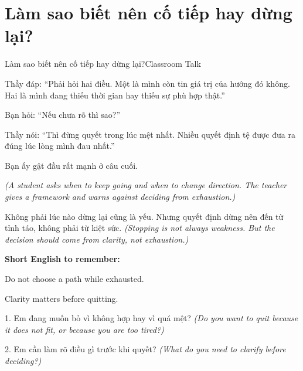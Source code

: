 \section{Làm sao biết nên cố tiếp hay dừng lại?}
\begin{truyen}{Làm sao biết nên cố tiếp hay dừng lại?}{Classroom Talk}

Thầy đáp: ``Phải hỏi hai điều. Một là mình còn tin giá trị của hướng đó không. Hai là mình đang thiếu thời gian hay thiếu sự phù hợp thật.''

Bạn hỏi: ``Nếu chưa rõ thì sao?''

Thầy nói: ``Thì đừng quyết trong lúc mệt nhất. Nhiều quyết định tệ được đưa ra đúng lúc lòng mình đau nhất.''

Bạn ấy gật đầu rất mạnh ở câu cuối.

\textit{(A student asks when to keep going and when to change direction. The teacher gives a framework and warns against deciding from exhaustion.)}
\end{truyen}

\begin{baihoc}
Không phải lúc nào dừng lại cũng là yếu. Nhưng quyết định dừng nên đến từ tỉnh táo, không phải từ kiệt sức.
\textit{(Stopping is not always weakness. But the decision should come from clarity, not exhaustion.)}
\end{baihoc}

\begin{ghinhoanh}
\textbf{Short English to remember:}

Do not choose a path while exhausted.

Clarity matters before quitting.
\end{ghinhoanh}

\begin{tuhocnhanh}
1. Em đang muốn bỏ vì không hợp hay vì quá mệt? \textit{(Do you want to quit because it does not fit, or because you are too tired?)}

2. Em cần làm rõ điều gì trước khi quyết? \textit{(What do you need to clarify before deciding?)}
\end{tuhocnhanh}
\ngancach